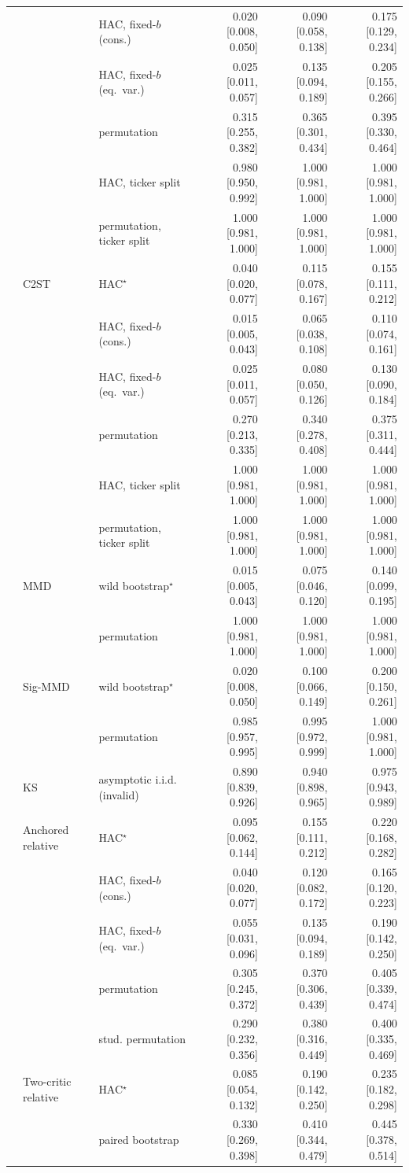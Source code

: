 \begin{tabular}{lllrrr}
 &  & HAC, fixed-$b$ (cons.) & 0.020 [0.008, 0.050] & 0.090 [0.058, 0.138] & 0.175 [0.129, 0.234] \\
 &  & HAC, fixed-$b$ (eq.\ var.) & 0.025 [0.011, 0.057] & 0.135 [0.094, 0.189] & 0.205 [0.155, 0.266] \\
 &  & permutation & 0.315 [0.255, 0.382] & 0.365 [0.301, 0.434] & 0.395 [0.330, 0.464] \\
 &  & HAC, ticker split & 0.980 [0.950, 0.992] & 1.000 [0.981, 1.000] & 1.000 [0.981, 1.000] \\
 &  & permutation, ticker split & 1.000 [0.981, 1.000] & 1.000 [0.981, 1.000] & 1.000 [0.981, 1.000] \\
 & C2ST & HAC$^{\star}$ & 0.040 [0.020, 0.077] & 0.115 [0.078, 0.167] & 0.155 [0.111, 0.212] \\
 &  & HAC, fixed-$b$ (cons.) & 0.015 [0.005, 0.043] & 0.065 [0.038, 0.108] & 0.110 [0.074, 0.161] \\
 &  & HAC, fixed-$b$ (eq.\ var.) & 0.025 [0.011, 0.057] & 0.080 [0.050, 0.126] & 0.130 [0.090, 0.184] \\
 &  & permutation & 0.270 [0.213, 0.335] & 0.340 [0.278, 0.408] & 0.375 [0.311, 0.444] \\
 &  & HAC, ticker split & 1.000 [0.981, 1.000] & 1.000 [0.981, 1.000] & 1.000 [0.981, 1.000] \\
 &  & permutation, ticker split & 1.000 [0.981, 1.000] & 1.000 [0.981, 1.000] & 1.000 [0.981, 1.000] \\
 & MMD & wild bootstrap$^{\star}$ & 0.015 [0.005, 0.043] & 0.075 [0.046, 0.120] & 0.140 [0.099, 0.195] \\
 &  & permutation & 1.000 [0.981, 1.000] & 1.000 [0.981, 1.000] & 1.000 [0.981, 1.000] \\
 & Sig-MMD & wild bootstrap$^{\star}$ & 0.020 [0.008, 0.050] & 0.100 [0.066, 0.149] & 0.200 [0.150, 0.261] \\
 &  & permutation & 0.985 [0.957, 0.995] & 0.995 [0.972, 0.999] & 1.000 [0.981, 1.000] \\
 & KS & asymptotic i.i.d. (invalid) & 0.890 [0.839, 0.926] & 0.940 [0.898, 0.965] & 0.975 [0.943, 0.989] \\
 & Anchored relative & HAC$^{\star}$ & 0.095 [0.062, 0.144] & 0.155 [0.111, 0.212] & 0.220 [0.168, 0.282] \\
 &  & HAC, fixed-$b$ (cons.) & 0.040 [0.020, 0.077] & 0.120 [0.082, 0.172] & 0.165 [0.120, 0.223] \\
 &  & HAC, fixed-$b$ (eq.\ var.) & 0.055 [0.031, 0.096] & 0.135 [0.094, 0.189] & 0.190 [0.142, 0.250] \\
 &  & permutation & 0.305 [0.245, 0.372] & 0.370 [0.306, 0.439] & 0.405 [0.339, 0.474] \\
 &  & stud. permutation & 0.290 [0.232, 0.356] & 0.380 [0.316, 0.449] & 0.400 [0.335, 0.469] \\
 & Two-critic relative & HAC$^{\star}$ & 0.085 [0.054, 0.132] & 0.190 [0.142, 0.250] & 0.235 [0.182, 0.298] \\
 &  & paired bootstrap & 0.330 [0.269, 0.398] & 0.410 [0.344, 0.479] & 0.445 [0.378, 0.514] \\
\bottomrule
\end{tabular}
